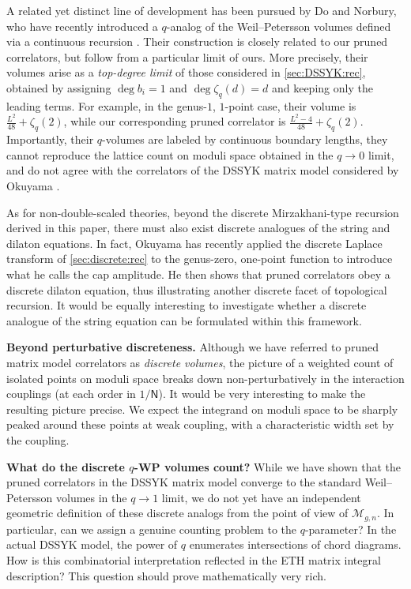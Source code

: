 \documentclass[a4paper,11pt,english]{article}
\theoremstyle{plain}
\theoremstyle{definition}
\theoremstyle{plain}
\newcommand{\ms}[1]{\mathsf{#1}}
\newcommand{\M}{\mathcal{M}}
\begin{document}
A related yet distinct line of development has been pursued by Do and Norbury, who have recently introduced a $q$-analog of the Weil--Petersson volumes defined via a continuous recursion \cite{DN}. Their construction is closely related to our pruned correlators, but follow from a particular limit of ours. More precisely, their volumes arise as a \emph{top-degree limit} of those considered in \cref{sec:DSSYK:rec}, obtained by assigning $\deg b_i = 1$ and $\deg \zeta_q(d) = d$ and keeping only the leading terms. For example, in the genus-$1$, $1$-point case, their volume is $\frac{L^2}{48} + \zeta_q(2)$, while our corresponding pruned correlator is $\frac{L^2 - 4}{48} + \zeta_q(2)$. Importantly, their $q$-volumes are labeled by continuous boundary lengths, they cannot reproduce the lattice count on moduli space obtained in the $q\to 0$ limit, and do not agree with the correlators of the DSSYK matrix model considered by Okuyama \cite{Oku23}. 

As for non-double-scaled theories, beyond the discrete Mirzakhani-type recursion derived in this paper, there must also exist discrete analogues of the string and dilaton equations. In fact, Okuyama \cite{OkuyamaCap} has recently applied the discrete Laplace transform of \cref{sec:discrete:rec} to the genus-zero, one-point function to introduce what he calls the cap amplitude. He then shows that pruned correlators obey a discrete dilaton equation, thus illustrating another discrete facet of topological recursion. It would be equally interesting to investigate whether a discrete analogue of the string equation can be formulated within this framework.

\medskip

\textbf{Beyond perturbative discreteness.} Although we have referred to pruned matrix model correlators as \emph{discrete volumes}, the picture of a weighted count of isolated points on moduli space breaks down non-perturbatively in the interaction couplings (at each order in $1/\ms{N}$). It would be very interesting to make the resulting picture precise. We expect the integrand on moduli space to be sharply peaked around these points at weak coupling, with a characteristic width set by the coupling.

\medskip

\textbf{What do the discrete $q$-WP volumes count?} While we have shown that the pruned correlators in the DSSYK matrix model converge to the standard Weil--Petersson volumes in the $q \to 1$ limit, we do not yet have an independent geometric definition of these discrete analogs from the point of view of $\M_{g,n}$. In particular, can we assign a genuine counting problem to the $q$-parameter? In the actual DSSYK model, the power of $q$ enumerates intersections of chord diagrams. How is this combinatorial interpretation reflected in the ETH matrix integral description? This question should prove mathematically very rich.
\end{document}

